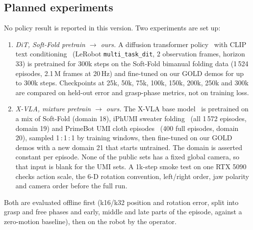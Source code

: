 \documentclass[conference,10pt]{IEEEtran}
\begin{document}
\subsection{Planned experiments}\label{sec:plannedexp}
No policy result is reported in this version. Two experiments are set up:
\begin{enumerate}
\item \emph{DiT, Soft-Fold pretrain $\to$ ours.} A diffusion transformer policy~\cite{peebles2023dit} with CLIP text
  conditioning~\cite{radford2021clip} (LeRobot \texttt{multi\_task\_dit}, 2 observation frames, horizon 33) is pretrained
  for 300k steps on the Soft-Fold bimanual folding data (1\,524 episodes, 2.1\,M frames at 20\,Hz) and fine-tuned on our
  GOLD demos for up to 300k steps. Checkpoints at 25k, 50k, 75k, 100k, 150k, 200k, 250k and 300k are compared on held-out
  error and grasp-phase metrics, not on training loss.
\item \emph{X-VLA, mixture pretrain $\to$ ours.} The X-VLA base model~\cite{xvla} is pretrained on a mix of Soft-Fold
  (domain 18), iPhUMI sweater folding~\cite{iphumi} (all 1\,572 episodes, domain 19) and PrimeBot UMI cloth
  episodes~\cite{primebot} (400 full episodes, domain 20), sampled 1\,:\,1\,:\,1 by training windows, then fine-tuned on our
  GOLD demos with a new domain 21 that starts untrained. The domain is asserted constant per episode. None of the public
  sets has a fixed global camera, so that input is blank for the UMI sets. A 1k-step smoke test on one RTX 5090 checks
  action scale, the 6-D rotation convention, left/right order, jaw polarity and camera order before the full run.
\end{enumerate}
Both are evaluated offline first (k16/k32 position and rotation error, split into grasp and free phases and early, middle
and late parts of the episode, against a zero-motion baseline), then on the robot by the operator.

\end{document}
